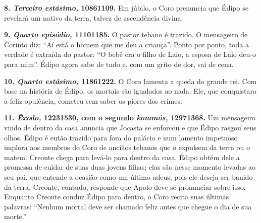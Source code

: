 \textbf{8. \emph{Terceiro estásimo,} 10861109.} Em júbilo, o Coro
prenuncia que Édipo se revelará um nativo da terra, talvez de
ascendência divina.

\textbf{9. \emph{Quarto episódio,} 11101185.} O pastor tebano é
trazido. O mensageiro de Corinto diz: ``Aí está o homem que me deu a
criança''. Ponto por ponto, toda a verdade é extraída do pastor: ``O
bebê era o filho de Laio, a esposa de Laio deu-o para mim''. Édipo agora
sabe de tudo e, com um grito de dor, sai de cena.

\textbf{10. \emph{Quarto estásimo,} 11861222.} O Coro lamenta a queda
do grande rei. Com base na história de Édipo, os mortais são igualados
ao nada. Ele, que conquistara a feliz opulência, cometeu sem saber os
piores dos crimes.

\textbf{11. \emph{Êxodo,} 12231530, com o segundo \emph{kommós,}
12971368.} Um mensageiro vindo de dentro da casa anuncia que Jocasta
se enforcou e que Édipo rasgou seus olhos. Édipo é então trazido para
fora do palácio e num lamento impetuoso implora aos membros do Coro de
anciãos tebanos que o expulsem da terra ou o matem. Creonte chega para
levá-lo para dentro da casa. Édipo obtém dele a promessa de cuidar de
suas duas jovens filhas; elas são nesse momento levadas ao seu pai, que
entende a ocasião como um último adeus, pois ele deseja ser banido da
terra. Creonte, contudo, responde que Apolo deve se pronunciar sobre
isso. Enquanto Creonte conduz Édipo para dentro, o Coro recita suas
últimas palavras: ``Nenhum mortal deve ser chamado feliz antes que
chegue o dia de sua morte.''
